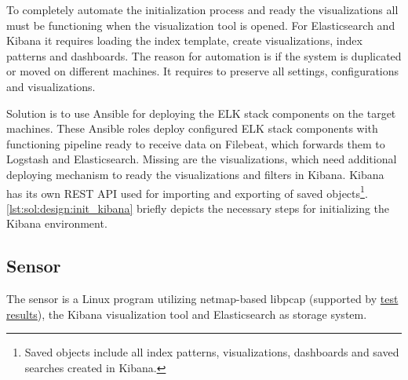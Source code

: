 \documentclass[12pt,a4paper,twoside]{report}
\begin{document}
				To completely automate the initialization process and ready the visualizations all must be functioning when the visualization tool is opened. For Elasticsearch and Kibana it requires loading the index template, create visualizations, index patterns and dashboards. The reason for automation is if the system is duplicated or moved on different machines. It requires to preserve all settings, configurations and visualizations.\par
				Solution is to use Ansible for deploying the ELK stack components on the target machines. These Ansible roles deploy configured ELK stack components with functioning pipeline ready to receive data on Filebeat, which forwards them to Logstash and Elasticsearch. Missing are the visualizations, which need additional deploying mechanism to ready the visualizations and filters in Kibana. Kibana has its own REST API used for importing and exporting of saved objects\footnote{Saved objects include all index patterns, visualizations, dashboards and saved searches created in Kibana.}. \autoref{lst:sol:design:init_kibana} briefly depicts the necessary steps for initializing the Kibana environment.				
				
				
		\subsection{Sensor} \label{solution:design:sensor}
			The sensor is a Linux program utilizing netmap-based libpcap (supported by \hyperref[analysis:testing:results]{test results}), the Kibana visualization tool and Elasticsearch as storage system. 
\end{document}
